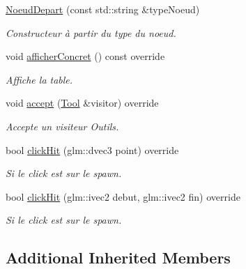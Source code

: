 \begin{DoxyCompactItemize}
\item 
\hyperlink{class_noeud_depart_a003d2fbed3f4e142a9187a8152a4663d}{Noeud\+Depart} (const std\+::string \&type\+Noeud)
\begin{DoxyCompactList}\small\item\em Constructeur à partir du type du noeud. \end{DoxyCompactList}\item 
void \hyperlink{class_noeud_depart_a1335eaf607cc753bf818aded966144fe}{afficher\+Concret} () const  override
\begin{DoxyCompactList}\small\item\em Affiche la table. \end{DoxyCompactList}\item 
void \hyperlink{class_noeud_depart_a5c105e25f600256c8933f70e07608413}{accept} (\hyperlink{class_tool}{Tool} \&visitor) override
\begin{DoxyCompactList}\small\item\em Accepte un visiteur Outils. \end{DoxyCompactList}\item 
\hypertarget{class_noeud_depart_a5bbaf0ff7096cff7e73f5054014b723e}{}bool \hyperlink{class_noeud_depart_a5bbaf0ff7096cff7e73f5054014b723e}{click\+Hit} (glm\+::dvec3 point) override\label{class_noeud_depart_a5bbaf0ff7096cff7e73f5054014b723e}

\begin{DoxyCompactList}\small\item\em Si le click est sur le spawn. \end{DoxyCompactList}\item 
\hypertarget{class_noeud_depart_a2dfe8b7300b4f1933993d44754e8f53f}{}bool \hyperlink{class_noeud_depart_a2dfe8b7300b4f1933993d44754e8f53f}{click\+Hit} (glm\+::ivec2 debut, glm\+::ivec2 fin) override\label{class_noeud_depart_a2dfe8b7300b4f1933993d44754e8f53f}

\begin{DoxyCompactList}\small\item\em Si le click est sur le spawn. \end{DoxyCompactList}\end{DoxyCompactItemize}

\subsection*{Additional Inherited Members}


